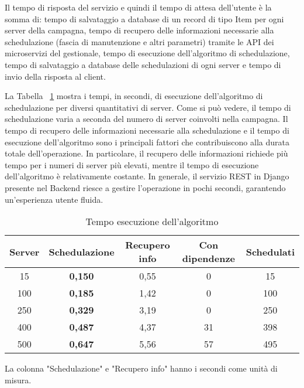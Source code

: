 Il tempo di risposta del servizio e quindi il tempo di attesa dell’utente è 
la somma di: tempo di salvataggio a database di un record di tipo Item per 
ogni server della campagna, tempo di recupero delle informazioni necessarie 
alla schedulazione (fascia di manutenzione e altri parametri) tramite le API 
dei microservizi del gestionale, tempo di esecuzione dell'algoritmo di 
schedulazione, tempo di salvataggio a database delle schedulazioni di ogni 
server e tempo di invio della risposta al client.

La Tabella ~\ref{tab:algo-exec} mostra i tempi, in secondi, di esecuzione 
dell'algoritmo di schedulazione per diversi quantitativi di server. Come si 
può vedere, il tempo di schedulazione varia a seconda del numero di server 
coinvolti nella campagna. Il tempo di recupero delle informazioni necessarie 
alla schedulazione e il tempo di esecuzione dell'algoritmo sono i principali 
fattori che contribuiscono alla durata totale dell'operazione. In particolare, 
il recupero delle informazioni richiede più tempo per i numeri di server più 
elevati, mentre il tempo di esecuzione dell'algoritmo è relativamente costante. 
In generale, il servizio REST in Django presente nel Backend riesce a gestire 
l'operazione in pochi secondi, garantendo un'esperienza utente fluida.\\

\begin {table}[H]
\begin{center}
\begin{tabular}{|c|c|c|c|c|}
  
  \hline
  \rowcolor[gray]{.66}
  \textbf{Server} & \textbf{Schedulazione} & \textbf{Recupero info} & \textbf{Con dipendenze} & \textbf{Schedulati}\\
  
  \hline
  \rowcolor[gray]{.87}15 & \textbf{0,150} & 0,55 & 0 & 15 \\
  \rowcolor[gray]{.95}100 & \textbf{0,185} & 1,42 & 0 & 100 \\
  \rowcolor[gray]{.87}250 & \textbf{0,329} & 3,19 & 0 & 250 \\
  \rowcolor[gray]{.95}400 & \textbf{0,487} & 4,37 & 31 & 398 \\
  \rowcolor[gray]{.87}500 & \textbf{0,647} & 5,56 & 57 & 495 \\
  \hline
\end{tabular} 
\caption {Tempo esecuzione dell'algoritmo}
\label{tab:algo-exec}
La colonna "Schedulazione" e "Recupero info" hanno i secondi come unità di misura.
\end{center}
\end{table}


